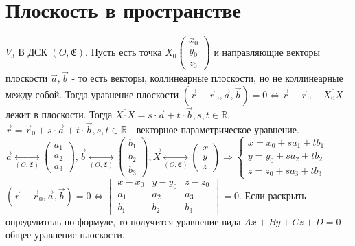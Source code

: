 \section{Плоскость в пространстве}
\(V_3\) В ДСК \((O, \mathfrak{E})\). Пусть есть точка \(X_0\begin{pmatrix}
	x_0 \\ y_0 \\ z_0
\end{pmatrix}\) и направляющие векторы плоскости \(\vec a, \vec b\) - то есть векторы, коллинеарные плоскости, но не коллинеарные между собой. Тогда уравнение плоскости \((\vec r - \vec r_0, \vec a, \vec b) = 0 \Longleftrightarrow \vec r - \vec r_0 - \overline{X_0X}\) - лежит в плоскости. Тогда \newline\(\overline{X_0X} = s\cdot\vec a + t\cdot\vec b, s, t \in \mathbb{R}\), \newline\(\vec r = \vec r_0 + s\cdot\vec a + t\cdot\vec b, s, t \in \mathbb{R}\) - векторное параметрическое уравнение. \newline
\(\vec a \underset{(O, \mathfrak{E})}{\longleftrightarrow}\begin{pmatrix}
	a_1 \\ a_2 \\ a_3
\end{pmatrix},
\vec b \underset{(O, \mathfrak{E})}{\longleftrightarrow}\begin{pmatrix}
	b_1 \\ b_2 \\ b_3
\end{pmatrix},
\vec X \underset{(O, \mathfrak{E})}{\longleftrightarrow}\begin{pmatrix}
	x \\ y \\ z
\end{pmatrix} \Longrightarrow \left\{
\begin{gathered}
	x = x_0 +sa_1 + tb_1 \\
	y = y_0 +sa_2+tb_2 \\
	z = z_0 +sa_3+tb_3
\end{gathered}
\right.\)
\newline
\((\vec r - \vec r_0, \vec a, \vec b) = 0 \Longleftrightarrow \begin{vmatrix}
	x-x_0 & y-y_0 & z-z_0 \\
	a_1 & a_2 & a_3 \\
	b_1 & b_2 & b_3
\end{vmatrix} = 0.\) Если раскрыть определитель по формуле, то получится уравнение вида \(Ax+By+Cz+D = 0\) - общее уравнение плоскости.
